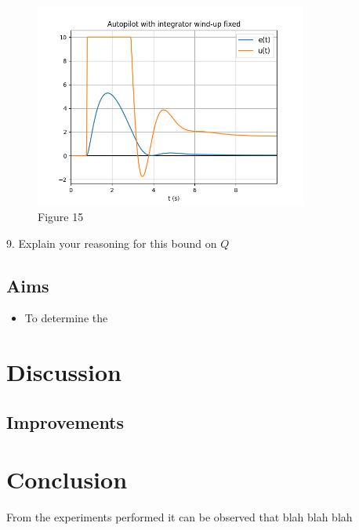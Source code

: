 \documentclass[8pt]{article}
\begin{document}
\begin{figure}[H]
    \centering
    \includegraphics[width=0.8\textwidth]{figures/FIGURE_15.png}
    \caption{Figure 15}
    \label{fig:figure15}
\end{figure}

9. Explain your reasoning for this bound on $Q$


\subsection{Aims}

\begin{itemize}
\item To determine the 
\end{itemize}

\newpage

\section{Discussion}


\subsection{Improvements}

\section{Conclusion}

From the experiments performed it can be observed that blah blah blah
\end{document}
